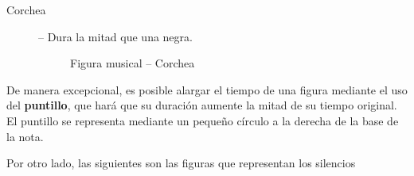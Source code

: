 \begin{description}
\vspace{-0.35cm}

\item[Corchea] -- Dura la mitad que una negra.
\vspace{-0.1cm}
\begin{figure}[h!]
  \centering
  \caption{Figura musical -- Corchea}
\end{figure}
\end{description}

\vspace{-0.35cm}

De manera excepcional, es posible alargar el tiempo de una figura mediante el
uso del \textbf{puntillo}, que hará que su duración aumente la mitad de su
tiempo original. El puntillo se representa mediante un pequeño círculo a la
derecha de la base de la nota.

Por otro lado, las siguientes son las figuras que representan los silencios
